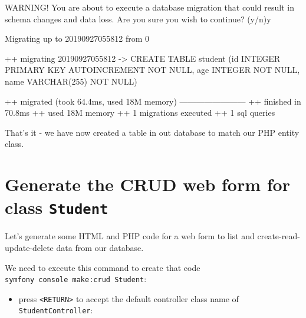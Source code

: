 \documentclass[a4paperpaper,openright]{book}
\newenvironment{Shaded}{}{}
\newcommand{\ExtensionTok}[1]{#1}
\newcommand{\NormalTok}[1]{#1}
\newcommand{\OperatorTok}[1]{\textcolor[rgb]{0.40,0.40,0.40}{#1}}
\providecommand{\tightlist}{%
  \setlength{\itemsep}{0pt}\setlength{\parskip}{0pt}}
\begin{document}
\begin{Shaded}
\begin{Highlighting}[]
    \ExtensionTok{WARNING}\NormalTok{! You are about to execute a database migration that could result in schema changes and data loss. }
    \ExtensionTok{Are}\NormalTok{ you sure you wish to continue? (y/n)}\ExtensionTok{y}

    \ExtensionTok{Migrating}\NormalTok{ up to 20190927055812 from 0}
    
      \ExtensionTok{++}\NormalTok{ migrating 20190927055812}
         \ExtensionTok{-}\OperatorTok{>}\NormalTok{ CREATE TABLE student (id INTEGER PRIMARY KEY AUTOINCREMENT NOT NULL, }
        \ExtensionTok{age}\NormalTok{ INTEGER NOT NULL, name VARCHAR(255) }\ExtensionTok{NOT}\NormalTok{ NULL)}
    
      \ExtensionTok{++}\NormalTok{ migrated (took 64.4ms, used 18M memory)}
      \ExtensionTok{------------------------}
      \ExtensionTok{++}\NormalTok{ finished in 70.8ms}
      \ExtensionTok{++}\NormalTok{ used 18M memory}
      \ExtensionTok{++}\NormalTok{ 1 migrations executed}
      \ExtensionTok{++}\NormalTok{ 1 sql queries}
\end{Highlighting}
\end{Shaded}

That's it - we have now created a table in out database to match our PHP
entity class.

\hypertarget{generate-the-crud-web-form-for-class-student}{%
\section{\texorpdfstring{Generate the \textbf{CRUD} web form for class
\texttt{Student}}{Generate the CRUD web form for class Student}}\label{generate-the-crud-web-form-for-class-student}}

Let's generate some HTML and PHP code for a web form to list and
create-read-update-delete data from our database.

We need to execute this command to create that code
\texttt{symfony\ console\ make:crud\ Student}:

\begin{itemize}
\tightlist
\item
  press \texttt{\textless{}RETURN\textgreater{}} to accept the default
  controller class name of \texttt{StudentController}:
\end{itemize}
\end{document}
